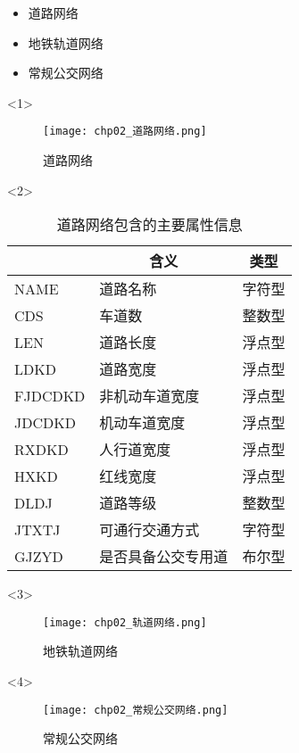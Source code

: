 \begin{frame}[t]{\subsecname}
\begin{itemize}
\item<1-> 道路网络   
\item<3-> 地铁轨道网络
\item<4-> 常规公交网络
\end{itemize}

\begin{overlayarea}{\textwidth}{\textheight}
  \begin{onlyenv}<1>
\begin{figure}\centering
    \texttt{[image: chp02\_道路网络.png]} 
    \caption{道路网络}
\end{figure}
  \end{onlyenv}

  \begin{onlyenv}<2>
\begin{table} \centering \scriptsize
  \renewcommand\arraystretch{0.9}
  \begin{tabular}{|m{}|m{}|m{}|}
    \toprule
    \rowcolor{LightCyan}
\multicolumn{1}{|c|}{\textbf{属性名称}} & \multicolumn{1}{c|}{\textbf{含义}} & \multicolumn{1}{c|}{\textbf{类型}}\\\hline
    NAME & 道路名称 & 字符型 \\\hline
    CDS & 车道数 & 整数型 \\\hline
    LEN & 道路长度 & 浮点型 \\\hline
    LDKD & 道路宽度 & 浮点型 \\\hline
    FJDCDKD & 非机动车道宽度 & 浮点型 \\\hline
    JDCDKD & 机动车道宽度 & 浮点型 \\\hline
    RXDKD & 人行道宽度 & 浮点型 \\\hline
    HXKD & 红线宽度 & 浮点型 \\\hline
    DLDJ & 道路等级 & 整数型 \\\hline
    JTXTJ & 可通行交通方式 & 字符型 \\\hline
    GJZYD & 是否具备公交专用道 & 布尔型 \\
    \bottomrule
  \end{tabular}
\caption{道路网络包含的主要属性信息}
\end{table}
  \end{onlyenv}

\vspace{-10pt}
  \begin{onlyenv}<3>
\begin{figure}\centering
    \texttt{[image: chp02\_轨道网络.png]}
    \caption{地铁轨道网络}
\end{figure}
  \end{onlyenv}

  \begin{onlyenv}<4>
\begin{figure}\centering
    \texttt{[image: chp02\_常规公交网络.png]}
    \caption{常规公交网络}
\end{figure}
  \end{onlyenv}
\end{overlayarea}
\end{frame}

